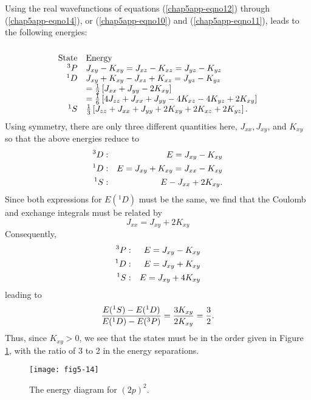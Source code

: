 Using the real wavefunctions of equations (\ref{chap5app-eqno12})
through (\ref{chap5app-eqno14}), or (\ref{chap5app-eqno10})  
and (\ref{chap5app-eqno11}), leads to the following energies:
\begin{equation}
\begin{array}{rl}\\
\mathrm{State} & \mathrm{Energy}\\
{^3P} & J_{xy} - K_{xy} = J_{xz} - K_{xz} = J_{yz} - K_{yz} \\
{^1D} & J_{xy} + K_{xy} - J_{xz} + K_{xz} = J_{yz} - K_{yz}\\
& = {1 \over 2} \left[ J_{xx} + J_{yy} - 2 K_{xy} \right]\cr
& = {1 \over 6} \left[ 4 J_{zz} + J_{xx} + J_{yy} - 4 K_{xz} - 4 
K_{yz} + 2 K_{xy} \right]\cr
{^1S} & {1 \over 3} \left[ J_{zz} + J_{xx} + J_{yy} + 2 K_{xy} + 
2K_{xz} + 2 K_{yz} \right].\\
\end{array}
\label{chap5app-eqno22}
\end{equation}
Using symmetry, there are only three different quantities here, 
$J_{xx} , J_{xy}$, and $K_{xy}$ so that the above energies reduce to
\begin{eqnarray}
{^3D} &:&  E = J_{xy} - K_{xy}\cr
{^1D} &:&  E = J_{xy} + K_{xy} = J_{xx} - K_{xy}\cr
{^1S} &:&  E - J_{xx} + 2 K_{xy} .
\label{chap5app-eqno23}
\end{eqnarray}
Since both expressions for $E({^1D})$ must be the same, we find that 
the Coulomb and exchange integrals must be related by
\begin{equation}
J_{xx} = J_{xy} + 2 K_{xy}
\end{equation}
Consequently,
\begin{eqnarray}
{^3P} &:& E = J_{xy} - K_{xy}\cr
{^1D} &:& E = J_{xy} + K_{xy}\cr
{^1S} &:& E = J_{xy} + 4 K_{xy}
\label{chap5app-eqno24}
\end{eqnarray}
leading to
\begin{equation}
{E({^1S}) - E({^1D}) \over E({^1D}) - E({^3P})} = 
{3K_{xy} \over 2K_{xy}} = {3 \over 2}.
\label{chap5app-eqno25}
\end{equation}
Thus, since $K_{xy} > 0$, we see that the states must be in the order 
given in Figure \ref{fig5-a-3}, with the ratio of 3 to 2 in the energy 
separations.  

\begin{figure}
\texttt{[image: fig5-14]}
\caption{The energy diagram for $(2p)^2$.}
\label{fig5-a-3}
\end{figure}

